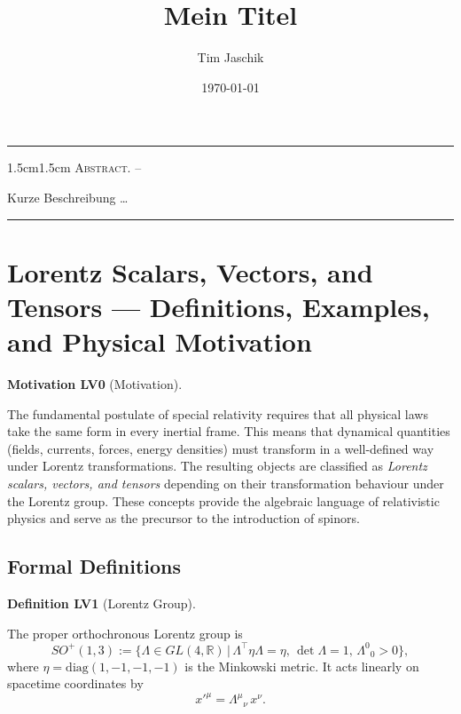 \documentclass[10pt, letterpaper]{article}
\title{Mein Titel}
\author{Tim Jaschik}
\date{\today}
\newcommand{\R}{\mathbb{R}}
\renewenvironment{abstract}
  {
    \begin{adjustwidth}{1.5cm}{1.5cm}
    \small
    \textsc{Abstract. –}%
  }
  {
    \end{adjustwidth}
  }
\newcommand{\CustomHeading}[3]{%
  \par\medskip\noindent%
  \textbf{#1 #2} \textnormal{(#3)}.\enskip%
}
\newenvironment{DEF}[2]{\begin{unitbox}\CustomHeading{Definition}{#1}{#2}}{\end{unitbox}}
\newenvironment{MOT}[2]{\begin{unitbox}\CustomHeading{Motivation}{#1}{#2}}{\end{unitbox}}
\begin{document}
\maketitle
\rule{\textwidth}{0.5pt}
\begin{abstract}
Kurze Beschreibung …
\end{abstract}
\rule{\textwidth}{0.5pt}
\vspace{0.5cm}

\tableofcontents

\pagebreak


\section{Lorentz Scalars, Vectors, and Tensors — Definitions, Examples, and Physical Motivation}

\begin{MOT}{LV0}{Motivation}
The fundamental postulate of special relativity requires that all physical laws take the same form in every inertial frame.
This means that dynamical quantities (fields, currents, forces, energy densities) must transform in a well-defined way under Lorentz transformations.
The resulting objects are classified as \emph{Lorentz scalars, vectors, and tensors} depending on their transformation behaviour under the Lorentz group.
These concepts provide the algebraic language of relativistic physics and serve as the precursor to the introduction of spinors.
\end{MOT}

\subsection{Formal Definitions}

\begin{DEF}{LV1}{Lorentz Group}
The proper orthochronous Lorentz group is
\[
SO^+(1,3)
  := \bigl\{ \Lambda\in GL(4,\R)
      \,\big|\,
      \Lambda^\top \eta \Lambda = \eta,\,
      \det\Lambda=1,\,
      \Lambda^0{}_0>0
     \bigr\},
\]
where $\eta=\mathrm{diag}(1,-1,-1,-1)$ is the Minkowski metric.
It acts linearly on spacetime coordinates by
\[
x'^\mu = \Lambda^\mu{}_\nu\, x^\nu.
\]
\end{DEF}
\end{document}
